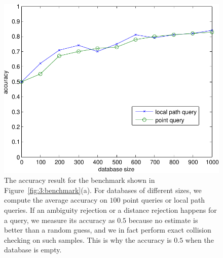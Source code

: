 \begin{figure}[h]
  \centering
  \includegraphics[width=0.8\linewidth]{figs/3/accuracy-crop.pdf}
  \caption[The accuracy of the instance-based learning framework on various benchmarks.]{\label{fig:3:accuracy} The accuracy result for the benchmark shown in Figure~\ref{fig:3:benchmark}(a). For databases of different sizes, we compute the average accuracy on $100$ point queries or local path queries. If an ambiguity rejection or a distance rejection happens for a query, we measure its accuracy as $0.5$ because no estimate is better than a random guess, and we in fact perform exact collision checking on such samples. This is why the accuracy is $0.5$ when the database is empty.}
\end{figure}





